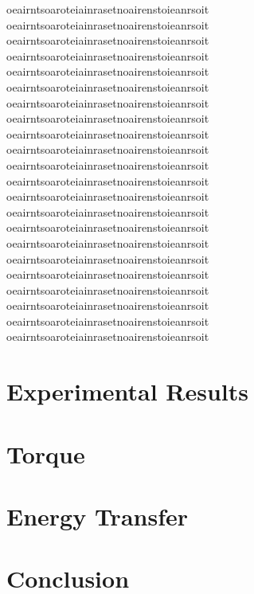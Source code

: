 \documentclass[%
 aip,
 amsmath,amssymb,
 reprint,%
 floatfix,%
]{revtex4-1}
\begin{document}
oeairntsoaroteiainrasetnoairenstoieanrsoit\\
oeairntsoaroteiainrasetnoairenstoieanrsoit\\
oeairntsoaroteiainrasetnoairenstoieanrsoit\\
oeairntsoaroteiainrasetnoairenstoieanrsoit\\
oeairntsoaroteiainrasetnoairenstoieanrsoit\\
oeairntsoaroteiainrasetnoairenstoieanrsoit\\
oeairntsoaroteiainrasetnoairenstoieanrsoit\\
oeairntsoaroteiainrasetnoairenstoieanrsoit\\
oeairntsoaroteiainrasetnoairenstoieanrsoit\\
oeairntsoaroteiainrasetnoairenstoieanrsoit\\
oeairntsoaroteiainrasetnoairenstoieanrsoit\\
oeairntsoaroteiainrasetnoairenstoieanrsoit\\
oeairntsoaroteiainrasetnoairenstoieanrsoit\\
oeairntsoaroteiainrasetnoairenstoieanrsoit\\
oeairntsoaroteiainrasetnoairenstoieanrsoit\\
oeairntsoaroteiainrasetnoairenstoieanrsoit\\
oeairntsoaroteiainrasetnoairenstoieanrsoit\\
oeairntsoaroteiainrasetnoairenstoieanrsoit\\
oeairntsoaroteiainrasetnoairenstoieanrsoit\\
oeairntsoaroteiainrasetnoairenstoieanrsoit\\
oeairntsoaroteiainrasetnoairenstoieanrsoit\\
oeairntsoaroteiainrasetnoairenstoieanrsoit

\section{\label{sec:level3}Experimental Results}

\section{\label{sec:level4}Torque}

\section{\label{sec:level5}Energy Transfer}

\section{\label{sec:level6}Conclusion}

\nocite{*}
\end{document}
